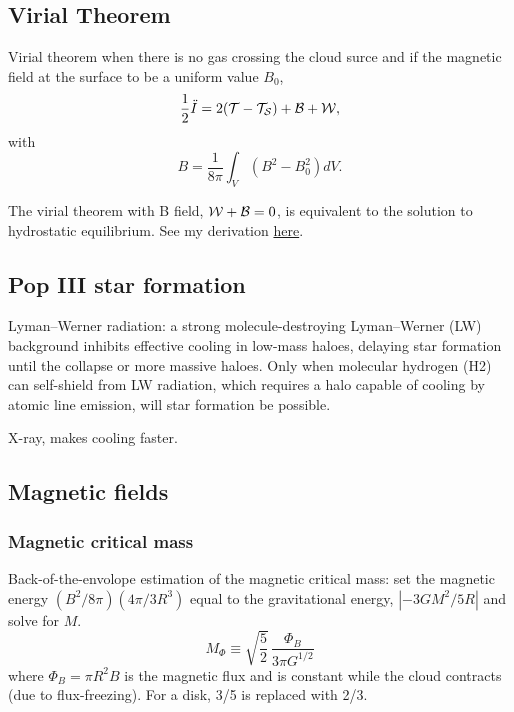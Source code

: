 \subsection{Virial Theorem}
\label{sec:org44a1ded}

Virial theorem when there is no gas crossing the cloud surce and if the magnetic field at the surface to be a uniform value \(B_0\),
$$
\frac{1}{2} \ddot I = 2({\cal T} - {\cal T_S}) + {\cal B} + {\cal W},
$$
with
$$
B = \frac{1}{8\pi} \int_V (B^2 - B_0^2) dV.
$$

The virial theorem with B field, \({\cal W} + {\cal B} = 0\), is equivalent to the solution to hydrostatic equilibrium. See my derivation \href{file:///Users/chongchonghe/Dropbox/Notability2/Container/Virial theorem with B field.pdf}{here}.

\subsection{Pop III star formation}
\label{sec:org0b2d3c0}
Lyman--Werner radiation: a strong molecule-destroying Lyman--Werner
(LW) background inhibits effective cooling in low-mass haloes,
delaying star formation until the collapse or more massive
haloes. Only when molecular hydrogen (H2) can self-shield from LW
radiation, which requires a halo capable of cooling by atomic line
emission, will star formation be possible.

X-ray, makes cooling faster.

\subsection{Magnetic fields}
\label{sec:org9de5245}

\subsubsection{Magnetic critical mass}

Back-of-the-envolope estimation of the magnetic critical mass: set the magnetic energy \((B^2/8\pi) (4\pi/3 R^3)\) equal to the gravitational energy, \(| -3GM^2/5R |\) and solve for \(M\).
\begin{equation}
M_\Phi \equiv \sqrt{\frac{5}{2}} \, \frac{\Phi_B}{3 \pi G^{1/2}}
\end{equation}
where \(\Phi_B = \pi R^2 B\) is the magnetic flux and is constant while the cloud contracts (due to flux-freezing).
For a disk, 3/5 is replaced with 2/3.

